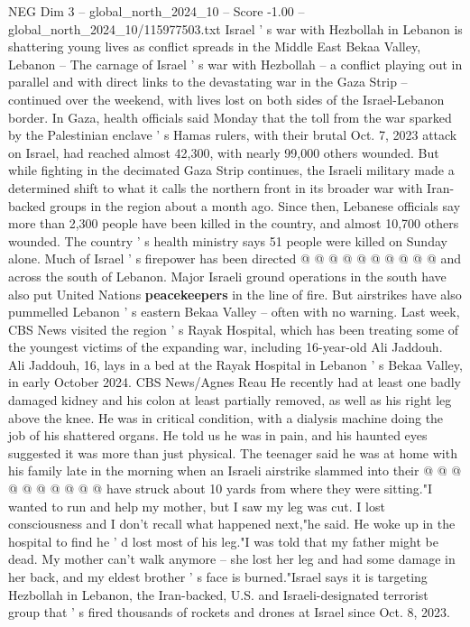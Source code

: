 \begin{textsample}{NEG Dim 3 – global\_north\_2024\_10 – Score -1.00 – global\_north\_2024\_10/115977503.txt}  \label{ex:f3_neg_303}
Israel ' s war with Hezbollah in Lebanon is shattering young lives as conflict spreads in the Middle East Bekaa Valley, Lebanon -- The carnage of Israel ' s war with Hezbollah -- a conflict playing out in parallel and with direct links to the devastating war in the Gaza Strip -- continued over the weekend, with lives lost on both sides of the Israel-Lebanon border.
In Gaza, health officials said Monday that the toll from the war sparked by the Palestinian enclave ' s Hamas rulers, with their brutal Oct. 7, 2023 attack on Israel, had reached almost 42,300, with nearly 99,000 others wounded.
But while fighting in the decimated Gaza Strip continues, the Israeli military made a determined shift to what it calls the northern front in its broader war with Iran-backed groups in the region about a month ago.
Since then, Lebanese officials say more than 2,300 people have been killed in the country, and almost 10,700 others wounded.
The country ' s health ministry says 51 people were killed on Sunday alone.
Much of Israel ' s firepower has been directed @ @ @ @ @ @ @ @ @ @ and across the south of Lebanon.
Major Israeli ground operations in the south have also put United Nations \textbf{peacekeepers} in the line of fire.
But airstrikes have also pummelled Lebanon ' s eastern Bekaa Valley -- often with no warning.
Last week, CBS News visited the region ' s Rayak Hospital, which has been treating some of the youngest victims of the expanding war, including 16-year-old Ali Jaddouh.
Ali Jaddouh, 16, lays in a bed at the Rayak Hospital in Lebanon ' s Bekaa Valley, in early October 2024.
CBS News/Agnes Reau He recently had at least one badly damaged kidney and his colon at least partially removed, as well as his right leg above the knee.
He was in critical condition, with a dialysis machine doing the job of his shattered organs.
He told us he was in pain, and his haunted eyes suggested it was more than just physical.
The teenager said he was at home with his family late in the morning when an Israeli airstrike slammed into their @ @ @ @ @ @ @ @ @ @ have struck about 10 yards from where they were sitting."I wanted to run and help my mother, but I saw my leg was cut.
I lost consciousness and I don't recall what happened next,"he said.
He woke up in the hospital to find he ' d lost most of his leg."I was told that my father might be dead.
My mother can't walk anymore -- she lost her leg and had some damage in her back, and my eldest brother ' s face is burned."Israel says it is targeting Hezbollah in Lebanon, the Iran-backed, U.S. and Israeli-designated terrorist group that ' s fired thousands of rockets and drones at Israel since Oct. 8, 2023.

\end{textsample}
